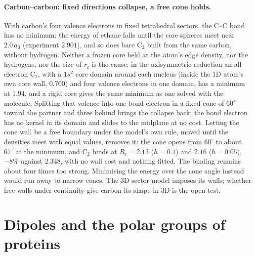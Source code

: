\paragraph{Carbon--carbon: fixed directions collapse, a free cone holds.} With carbon's four valence
electrons in fixed tetrahedral sectors, the C--C bond has no minimum: the energy of ethane falls until the core
spheres meet near $2.0\,a_0$ (experiment $2.901$), and so does bare C$_2$ built from the same carbon, without
hydrogen. Neither a frozen core held at the atom's edge density, nor the hydrogens, nor the size of $r_c$ is the
cause: in the axisymmetric reduction an all-electron C$_2$, with a $1s^2$ core domain around each nucleus (inside
the 1D atom's own core wall, $0.700$) and four valence electrons in one domain, has a minimum at $1.94$, and a
rigid core gives the same minimum as one solved with the molecule. Splitting that valence into one bond electron
in a fixed cone of $60^\circ$ toward the partner and three behind brings the collapse back: the bond electron has
no kernel in its domain and slides to the midplane at no cost. Letting the cone wall be a free boundary under
the model's own rule, moved until the densities meet with equal values, removes it: the cone opens from
$60^\circ$ to about $67^\circ$ at the minimum, and C$_2$ binds at $R_e = 2.13$ ($h = 0.1$) and $2.16$
($h = 0.05$), $-8\%$ against $2.348$, with no wall cost and nothing fitted. The binding remains about four times
too strong. Minimising the energy over the cone angle instead would run away to narrow cones. The 3D sector
model imposes its walls; whether free walls under continuity give carbon its shape in 3D is the open test.

\section{Dipoles and the polar groups of proteins}\label{sec:hydride-dipoles}

